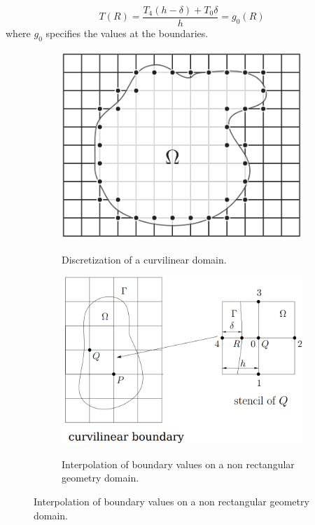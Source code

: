 \begin{equation}
   T(R) = \frac{T_4(h-\delta) + T_0 \delta}{h} = g_0(R)
   \label{eq:interpolateboundary}
\end{equation}
where $g_0$ specifies the values at the boundaries.
\begin{figure}
	\begin{subfigure}{1.0\textwidth}
		\includegraphics[width=\linewidth]{./images/CA_FDM/grid_custom_shape}
		\label{fig:gridcustomshape}
		\caption{Discretization of a curvilinear domain.}
	\end{subfigure}		
	\endminipage\hfill
	\begin{subfigure}{1.0\textwidth}
		\includegraphics[width=\linewidth]{./images/CA_FDM/gridcustom_shape2}
		\label{fig:gridcustom_shape2}
		\caption{Interpolation of boundary values on a non rectangular geometry domain.}
	\end{subfigure}
	\endminipage\hfill
\end{figure}

